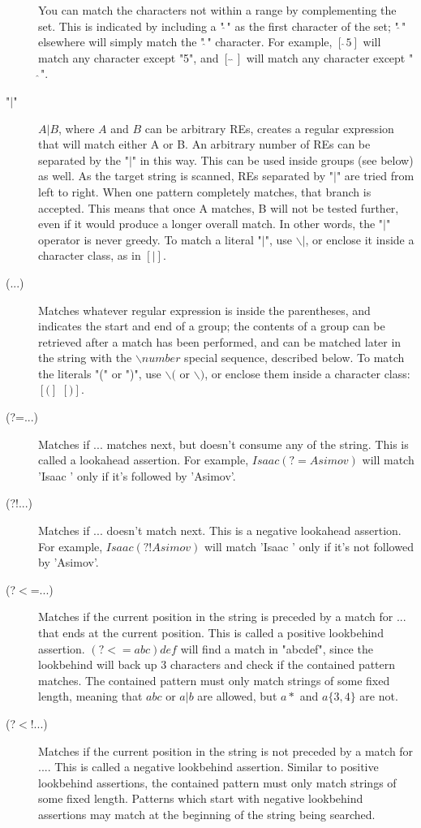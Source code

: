 \begin{description}
    You can match the characters not within a range by complementing the set. This is indicated by including a "$\hat{~}$" as the first character of the set; "$\hat{~}$" elsewhere will simply match the "$\hat{~}$" character. For example, $[\hat{~}5]$ will match any character except "5", and $[\hat{~}\hat{~}]$ will match any character except "$\hat{~}$".
    \item ["$\vert$"]
    $A|B$, where $A$ and $B$ can be arbitrary REs, creates a regular expression that will match either A or B. An arbitrary number of REs can be separated by the "$\vert$" in this way. This can be used inside groups (see below) as well. As the target string is scanned, REs separated by "$\vert$" are tried from left to right. When one pattern completely matches, that branch is accepted. This means that once A matches, B will not be tested further, even if it would produce a longer overall match. In other words, the "$|$" operator is never greedy. To match a literal "$|$", use $\backslash|$, or enclose it inside a character class, as in $[|]$.
    \item [(...)]
    Matches whatever regular expression is inside the parentheses, and indicates the start and end of a group; the contents of a group can be retrieved after a match has been performed, and can be matched later in the string with the $\backslash number$ special sequence, described below. To match the literals "(" or ")", use $\backslash($ or $\backslash)$, or enclose them inside a character class: $[(]$ $[)]$.
    \item [(?=...)]
    Matches if ... matches next, but doesn't consume any of the string. This is called a lookahead assertion. For example, $Isaac (?=Asimov)$ will match 'Isaac ' only if it's followed by 'Asimov'.
    \item [(?!...)]
    Matches if ... doesn't match next. This is a negative lookahead assertion. For example, $Isaac (?!Asimov)$ will match 'Isaac ' only if it's not followed by 'Asimov'.
    \item [(?$<$=...)]
    Matches if the current position in the string is preceded by a match for ... that ends at the current position. This is called a positive lookbehind assertion. $(?<=abc)def$ will find a match in "abcdef", since the lookbehind will back up 3 characters and check if the contained pattern matches. The contained pattern must only match strings of some fixed length, meaning that $abc$ or $a|b$ are allowed, but $a*$ and $a\{3,4\}$ are not.
    \item [(?$<$!...)]
    Matches if the current position in the string is not preceded by a match for .... This is called a negative lookbehind assertion. Similar to positive lookbehind assertions, the contained pattern must only match strings of some fixed length. Patterns which start with negative lookbehind assertions may match at the beginning of the string being searched.

\end{description}
